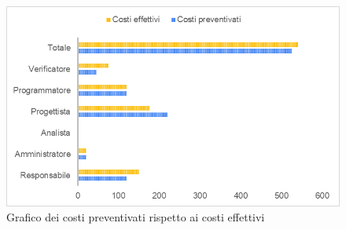 \begin{figure} [H]
	\includegraphics[width=\linewidth]{./img/Grafici/42.png}
	\caption{Grafico dei costi preventivati rispetto ai costi effettivi}
\end{figure}

